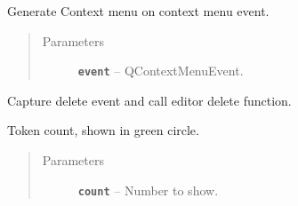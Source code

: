 \documentclass[a4paper,10pt,english]{sphinxmanual}
\begin{document}
\begin{fulllineitems}
\begin{fulllineitems}
\begin{quote}
\begin{description}
\end{description}\end{quote}

\end{fulllineitems}


\begin{fulllineitems}
\label{model_link:model.TokenItem.TokenItem.contextMenuEvent}
Generate Context menu on context menu event.
\begin{quote}\begin{description}
\item[{Parameters}] \leavevmode
\textbf{\texttt{event}} -- QContextMenuEvent.

\end{description}\end{quote}

\end{fulllineitems}


\begin{fulllineitems}
\label{model_link:model.TokenItem.TokenItem.deleteItemLocal}
Capture delete event and call editor delete function.

\end{fulllineitems}


\begin{fulllineitems}
\label{model_link:model.TokenItem.TokenItem.setCountToken}
Token count, shown in green circle.
\begin{quote}\begin{description}
\item[{Parameters}] \leavevmode
\textbf{\texttt{count}} -- Number to show.

\end{description}\end{quote}

\end{fulllineitems}


\end{fulllineitems}

\end{document}
